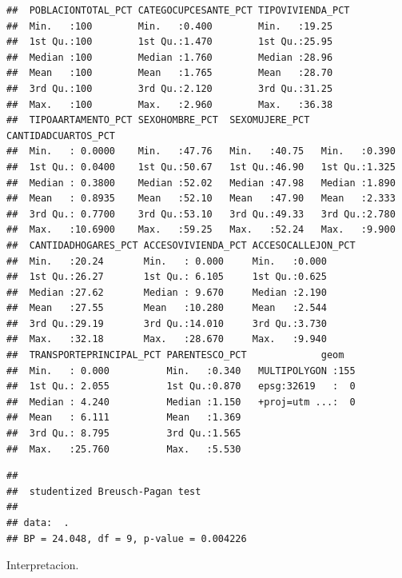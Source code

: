 \documentclass[11pt,]{article}
\newenvironment{Shaded}{\begin{snugshade}}{\end{snugshade}}
\newcommand{\StringTok}[1]{\textcolor[rgb]{0.31,0.60,0.02}{#1}}
\newcommand{\CommentTok}[1]{\textcolor[rgb]{0.56,0.35,0.01}{\textit{#1}}}
\newcommand{\OperatorTok}[1]{\textcolor[rgb]{0.81,0.36,0.00}{\textbf{#1}}}
\newcommand{\NormalTok}[1]{#1}
\begin{document}
\begin{verbatim}
##  POBLACIONTOTAL_PCT CATEGOCUPCESANTE_PCT TIPOVIVIENDA_PCT
##  Min.   :100        Min.   :0.400        Min.   :19.25   
##  1st Qu.:100        1st Qu.:1.470        1st Qu.:25.95   
##  Median :100        Median :1.760        Median :28.96   
##  Mean   :100        Mean   :1.765        Mean   :28.70   
##  3rd Qu.:100        3rd Qu.:2.120        3rd Qu.:31.25   
##  Max.   :100        Max.   :2.960        Max.   :36.38   
##  TIPOAARTAMENTO_PCT SEXOHOMBRE_PCT  SEXOMUJERE_PCT  CANTIDADCUARTOS_PCT
##  Min.   : 0.0000    Min.   :47.76   Min.   :40.75   Min.   :0.390      
##  1st Qu.: 0.0400    1st Qu.:50.67   1st Qu.:46.90   1st Qu.:1.325      
##  Median : 0.3800    Median :52.02   Median :47.98   Median :1.890      
##  Mean   : 0.8935    Mean   :52.10   Mean   :47.90   Mean   :2.333      
##  3rd Qu.: 0.7700    3rd Qu.:53.10   3rd Qu.:49.33   3rd Qu.:2.780      
##  Max.   :10.6900    Max.   :59.25   Max.   :52.24   Max.   :9.900      
##  CANTIDADHOGARES_PCT ACCESOVIVIENDA_PCT ACCESOCALLEJON_PCT
##  Min.   :20.24       Min.   : 0.000     Min.   :0.000     
##  1st Qu.:26.27       1st Qu.: 6.105     1st Qu.:0.625     
##  Median :27.62       Median : 9.670     Median :2.190     
##  Mean   :27.55       Mean   :10.280     Mean   :2.544     
##  3rd Qu.:29.19       3rd Qu.:14.010     3rd Qu.:3.730     
##  Max.   :32.18       Max.   :28.670     Max.   :9.940     
##  TRANSPORTEPRINCIPAL_PCT PARENTESCO_PCT             geom    
##  Min.   : 0.000          Min.   :0.340   MULTIPOLYGON :155  
##  1st Qu.: 2.055          1st Qu.:0.870   epsg:32619   :  0  
##  Median : 4.240          Median :1.150   +proj=utm ...:  0  
##  Mean   : 6.111          Mean   :1.369                      
##  3rd Qu.: 8.795          3rd Qu.:1.565                      
##  Max.   :25.760          Max.   :5.530
\end{verbatim}

\begin{Shaded}
\end{Shaded}

\begin{verbatim}
## 
##  studentized Breusch-Pagan test
## 
## data:  .
## BP = 24.048, df = 9, p-value = 0.004226
\end{verbatim}

Interpretacion.
\end{document}

